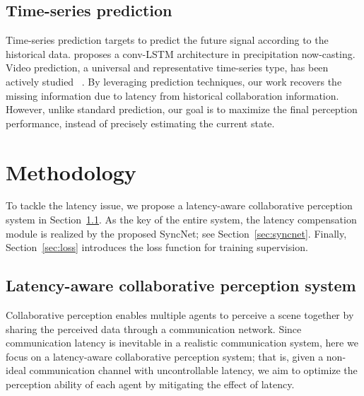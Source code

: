 \documentclass[runningheads]{llncs}
\begin{document}
\subsection{Time-series prediction}

Time-series prediction targets to predict the future signal according to the historical data. \cite{convlstm} proposes a conv-LSTM architecture in precipitation now-casting. Video prediction, a universal and representative time-series type, has been actively studied ~\cite{frnn,convtt,predrnn++,e3d,predrnn,mim}. By leveraging prediction techniques, our work recovers the missing information due to latency from historical collaboration information. However, unlike standard prediction, our goal is to maximize the final perception performance, instead of precisely estimating the current state. 

\section{Methodology}
To tackle the latency issue, we propose a latency-aware collaborative perception system in Section~\ref{sec:FSP}. As the key of the entire system, the latency compensation module is realized by the proposed SyncNet; see Section~\ref{sec:syncnet}. Finally, Section~\ref{sec:loss} introduces the loss function for training supervision.
\subsection{Latency-aware collaborative perception system}

\label{sec:FSP}
Collaborative perception enables multiple agents to perceive a scene together by sharing the perceived data through a communication network. Since communication latency is inevitable in a realistic communication system, here we focus on a latency-aware collaborative perception system; that is, given a non-ideal communication channel with uncontrollable latency, we aim to optimize the perception ability of each agent by mitigating the effect of latency.
\end{document}
